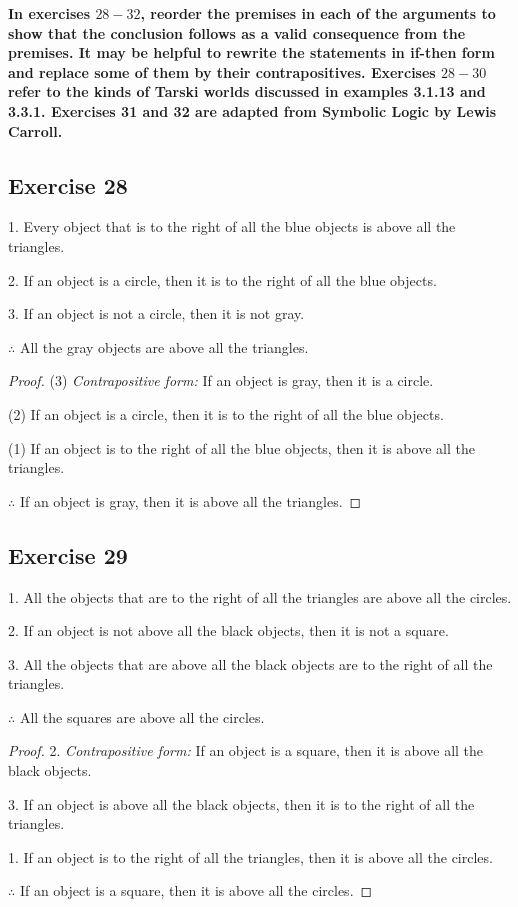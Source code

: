 \documentclass[14pt]{extarticle}
\begin{document}
{\bf \color{cyan} In exercises $28-32$, reorder the premises in each of the arguments to show that the conclusion follows as a valid consequence from the premises. It may be helpful to rewrite the statements in if-then form and replace some of them by their contrapositives. Exercises $28-30$ refer to the kinds of Tarski worlds discussed in examples 3.1.13 and 3.3.1. Exercises 31 and 32 are adapted from Symbolic Logic by Lewis Carroll.}

\subsection{Exercise 28}
1. Every object that is to the right of all the blue objects is above all the triangles.

2. If an object is a circle, then it is to the right of all the blue objects.

3. If an object is not a circle, then it is not gray. 

$\therefore$ All the gray objects are above all the triangles.

\begin{proof}
(3) {\it Contrapositive form:} If an object is gray, then it is a circle.

(2) If an object is a circle, then it is to the right of all the blue objects. 

(1) If an object is to the right of all the blue objects, then it is above all the triangles.

$\therefore$ If an object is gray, then it is above all the triangles.
\end{proof}

\subsection{Exercise 29}
1. All the objects that are to the right of all the triangles are above all the circles.

2. If an object is not above all the black objects, then it is not a square.

3. All the objects that are above all the black objects are to the right of all the triangles.

$\therefore$ All the squares are above all the circles.

\begin{proof}
2. {\it Contrapositive form:} If an object is a square, then it is above all the black objects.

3. If an object is above all the black objects, then it is to the right of all the triangles.

1. If an object is to the right of all the triangles, then it is above all the circles.

$\therefore$ If an object is a square, then it is above all the circles.
\end{proof}
\end{document}
